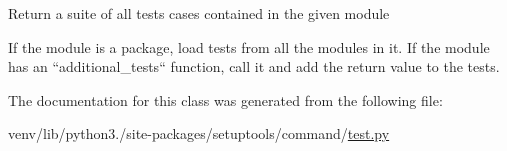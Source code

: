 \begin{DoxyVerb}Return a suite of all tests cases contained in the given module

If the module is a package, load tests from all the modules in it.
If the module has an ``additional_tests`` function, call it and add
the return value to the tests.
\end{DoxyVerb}
 

The documentation for this class was generated from the following file\+:\begin{DoxyCompactItemize}
\item 
venv/lib/python3./site-\/packages/setuptools/command/\hyperlink{venv_2lib_2python3_89_2site-packages_2setuptools_2command_2test_8py}{test.\+py}\end{DoxyCompactItemize}
